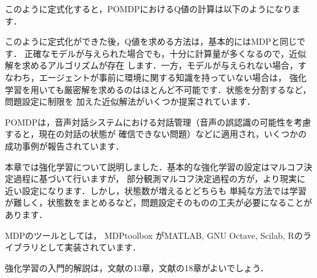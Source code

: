 
このように定式化すると，POMDPにおけるQ値の計算は以下のようになります．

このように定式化ができた後，Q値を求める方法は，基本的にはMDPと同じです．
正確なモデルが与えられた場合でも，十分に計算量が多くなるので，近似解を求めるアルゴリズムが存在
します．一方，モデルが与えられない場合，すなわち，エージェントが事前に環境に関する知識を持っていない場合は，
強化学習を用いても厳密解を求めるのはほとんど不可能です．状態を分割するなど，問題設定に制限を
加えた近似解法がいくつか提案されています．

POMDPは，音声対話システムにおける対話管理（音声の誤認識の可能性を考慮すると，現在の対話の状態が
確信できない問題）などに適用され，いくつかの成功事例が報告されています．


本章では強化学習について説明しました．基本的な強化学習の設定はマルコフ決定過程に基づいて行いますが，
部分観測マルコフ決定過程の方が，より現実に近い設定になります．しかし，状態数が増えるとどちらも
単純な方法では学習が難しく，状態数をまとめるなど，問題設定そのものの工夫が必要になることがあります．

MDPのツールとしては，
MDPtoolbox
がMATLAB, GNU Octave, Scilab, Rのライブラリとして実装されています．

強化学習の入門的解説は，文献\cite{mitchell97}の13章，文献\cite{alpaydin10}の18章がよいでしょう．
